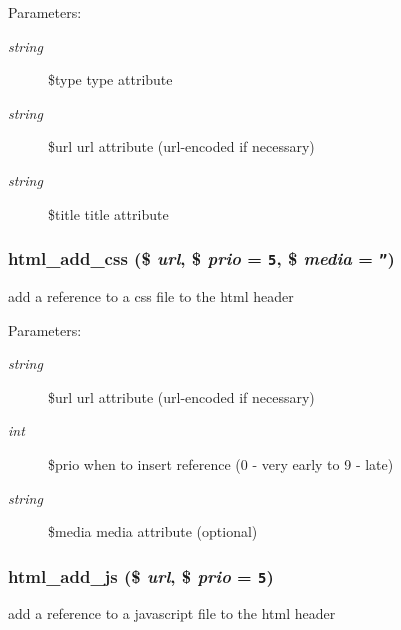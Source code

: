 \begin{Desc}
\item[Parameters:]
\begin{description}
\item[{\em string}]\$type type attribute \item[{\em string}]\$url url attribute (url-encoded if necessary) \item[{\em string}]\$title title attribute \end{description}
\end{Desc}
\hypertarget{html_8inc_8php_962ef1b29e909a38b9a7b79086d54ab2}{
\subsubsection[{html\_\-add\_\-css}]{\setlength{\rightskip}{0pt plus 5cm}html\_\-add\_\-css (\$ {\em url}, \/  \$ {\em prio} = {\tt 5}, \/  \$ {\em media} = {\tt ''})}}
\label{html_8inc_8php_962ef1b29e909a38b9a7b79086d54ab2}


add a reference to a css file to the html header

\begin{Desc}
\item[Parameters:]
\begin{description}
\item[{\em string}]\$url url attribute (url-encoded if necessary) \item[{\em int}]\$prio when to insert reference (0 - very early to 9 - late) \item[{\em string}]\$media media attribute (optional) \end{description}
\end{Desc}
\hypertarget{html_8inc_8php_450214704e1bbc2e8849abb54db38a03}{
\subsubsection[{html\_\-add\_\-js}]{\setlength{\rightskip}{0pt plus 5cm}html\_\-add\_\-js (\$ {\em url}, \/  \$ {\em prio} = {\tt 5})}}
\label{html_8inc_8php_450214704e1bbc2e8849abb54db38a03}


add a reference to a javascript file to the html header

